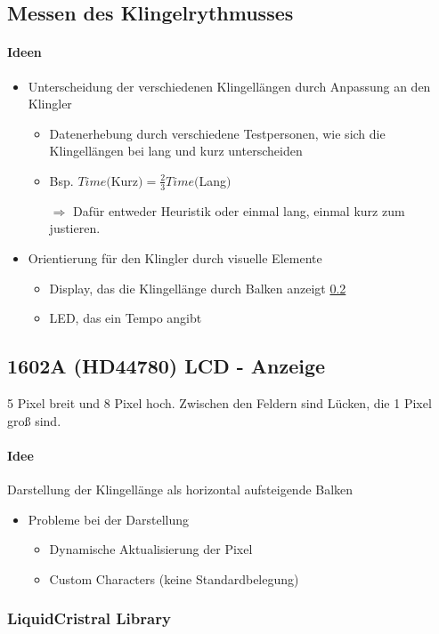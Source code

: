 \documentclass{scrartcl}
\begin{document}

\subsection{Messen des Klingelrythmusses}\label{ssec:mess}

\paragraph{Ideen}
\begin{itemize}
\item Unterscheidung der verschiedenen Klingellängen durch Anpassung an den Klingler
\begin{itemize}
\item Datenerhebung durch verschiedene Testpersonen, wie sich die Klingellängen bei lang und kurz unterscheiden
\item Bsp. $Time($Kurz$) = \frac{2}{3} Time($Lang$)$
\item[$\Rightarrow$] Dafür entweder Heuristik oder einmal lang, einmal kurz zum justieren.
\end{itemize}
\item Orientierung für den Klingler durch visuelle Elemente
\begin{itemize}
\item Display, das die Klingellänge durch Balken anzeigt \ref{ssec:lcd}
\item LED, das ein Tempo angibt
\end{itemize}
\end{itemize}



\subsection{1602A (HD44780) LCD - Anzeige}\label{ssec:lcd} 


5 Pixel breit und 8 Pixel hoch. Zwischen den Feldern sind Lücken, die 1 Pixel groß sind.
\paragraph{Idee} Darstellung der Klingellänge als horizontal aufsteigende Balken
\begin{itemize}
\item Probleme bei der Darstellung
\begin{itemize}
\item Dynamische Aktualisierung der Pixel
\item Custom Characters (keine Standardbelegung)
\end{itemize}
\end{itemize}


\subsubsection{LiquidCristral Library}

%
%
\end{document}
